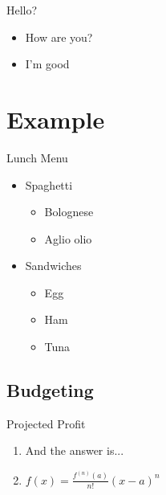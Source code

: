 \documentclass[aspectratio=1610,17pt,utf8]{beamer}
\begin{document}
\begin{frame}{Hello?}

\begin{itemize}
\item How are you?
\item I'm good
\end{itemize}
\end{frame}


\section{Example}


\begin{frame}{Lunch Menu}

\begin{itemize}
\item Spaghetti
  \begin{itemize}
  \item Bolognese
  \item Aglio olio
  \end{itemize}
\item Sandwiches
  \begin{itemize}
  \item Egg
  \item Ham
  \item Tuna
  \end{itemize}
\end{itemize}
\end{frame}


\subsection{Budgeting}

\begin{frame}{Projected Profit}

\begin{enumerate}
\item And the answer is...
\item $f(x)=\frac{f^{(n)}(a)}{n!}(x-a)^n$
\end{enumerate}

\end{frame}

\end{document}
